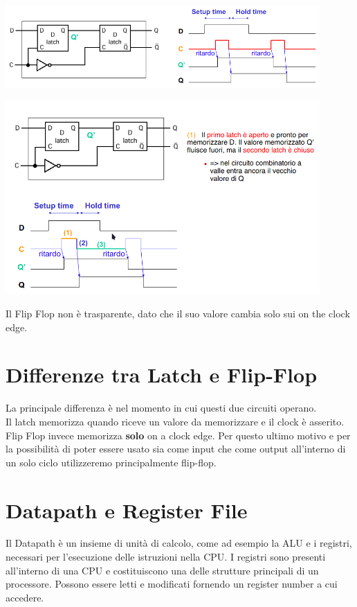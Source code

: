 \documentclass[12pt, a4paper, openany]{book}
\begin{document}
\begin{center}
    \includegraphics[width=120mm, scale=0.5]{d_flip_flop.png}
\end{center}
\begin{center}
    \includegraphics[width=120mm, scale=0.7]{d_flip-flop circuito.png}
\end{center}
Il Flip Flop non è trasparente, dato che il suo valore cambia solo sui on the clock
edge.

\section{Differenze tra Latch e Flip-Flop}
La principale differenza è nel momento in cui questi due circuiti operano.
\\ Il latch memorizza quando riceve un valore da memorizzare e il clock è asserito.
\\ Flip Flop invece memorizza \textbf{solo} on a clock edge.
Per questo ultimo motivo e per la possibilità di poter essere usato sia come
input che come output all'interno di un solo ciclo utilizzeremo principalmente 
flip-flop.

\section{Datapath e Register File}
Il Datapath è un insieme di unità di calcolo, come ad esempio la ALU e i registri,
necessari per l'esecuzione delle istruzioni nella CPU.
I registri sono presenti all'interno di una CPU e costituiscono una delle strutture
principali di un processore. Possono essere letti e modificati fornendo un register number
a cui accedere.
\end{document}
